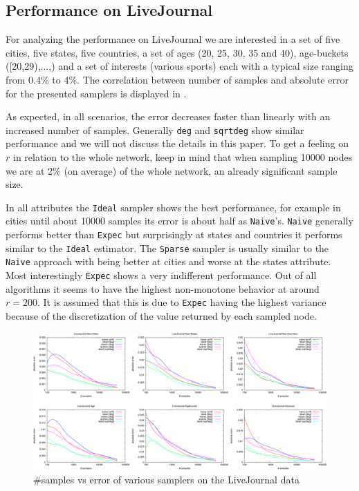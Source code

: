 \subsection{Performance on LiveJournal}
For analyzing the performance on LiveJournal we are interested in a set of five cities, five states, five countries, a set of ages (20, 25, 30, 35 and 40), age-buckets ([20,29),...,) and a set of interests (various sports) each with a typical size ranging from 0.4\% to 4\%.
The correlation between number of samples and absolute error for the presented samplers is displayed in .

As expected, in all scenarios, the error decreases faster than linearly with an increased number of samples.
Generally \texttt{deg} and \texttt{sqrtdeg} show similar performance and we will not discuss the details in this paper.
To get a feeling on $r$ in relation to the whole network, keep in mind that when sampling 10000 nodes we are at 2\% (on average) of the whole network, an already significant sample size.

In all attributes the \texttt{Ideal} sampler shows the best performance, for example in cities until about 10000 samples its error is about half as \texttt{Naive}'s.
\texttt{Naive} generally performs better than \texttt{Expec} but surprisingly at states and countries it performs similar to the \texttt{Ideal} estimator.
The \texttt{Sparse} sampler is usually similar to the \texttt{Naive} approach with being better at cities and worse at the states attribute.
Most interestingly \texttt{Expec} shows a very indifferent performance. Out of all algorithms it seems to have the highest non-monotone behavior at around $r=200$. It is assumed that this is due to \texttt{Expec} having the highest variance because of the discretization of the value returned by each sampled node.
\begin{figure}[!ht]
  \begin{center}
    \includegraphics[width=\linewidth]{fig2_3}
    \caption{\#samples vs error of various samplers on the LiveJournal data}
  \end{center}
\end{figure}
